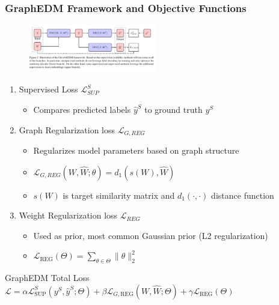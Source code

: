 \documentclass{beamer}
\begin{document}
\begin{frame}
    \frametitle{GraphEDM Framework and Objective Functions}
    \begin{figure}[htp]
        \centering
        \includegraphics[width=0.5\textwidth]{images/graphEDM-crop.pdf}
    \end{figure}
    \begin{enumerate}
        \item Supervised Loss $\mathcal{L}_{SUP}^{S}$
        \begin{itemize}
            \item Compares predicted labels $\widehat{y}^{S}$ to ground truth $y^{S}$
        \end{itemize}
        \item Graph Regularization loss $\mathcal{L}_{G,REG}$
            \begin{itemize}
                \item Regularizes model parameters based on graph structure 
                \item $\mathcal{L}_{G,REG}(W,\widehat{W};\theta) =d_{1}(s(W),\widehat{W})$
                \item $s(W)$ is target similarity matrix and $d_{1}(\cdot,\cdot)$ distance function
            \end{itemize}
        \item Weight Regularization loss $\mathcal{L}_{REG}$
            \begin{itemize}
                \item Used as prior, most common Gaussian prior (L2 regularization)
                \item $\mathcal{L}_{\mathrm{REG}}(\Theta)=\sum_{\theta \in \Theta}\|\theta\|_{2}^{2}$
            \end{itemize}
    \end{enumerate}
    \begin{block}{GraphEDM Total Loss}
        $\mathcal{L}=\alpha \mathcal{L}_{\mathrm{SUP}}^{S}\left(y^{S}, \hat{y}^{S} ; \Theta\right)+\beta \mathcal{L}_{G, \mathrm{REG}}(W, \widehat{W} ; \Theta)+\gamma \mathcal{L}_{\mathrm{REG}}(\Theta)$
        \end{block}

\end{frame}
\end{document}
